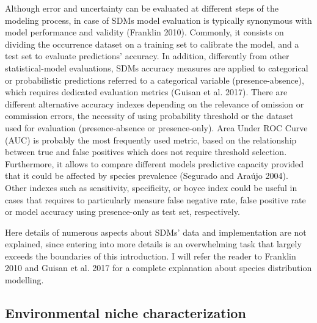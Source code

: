 \documentclass[11pt,twoside]{reedthesis}
\begin{document}
Although error and uncertainty can be evaluated at different steps of
the modeling process, in case of SDMs model evaluation is typically
synonymous with model performance and validity (Franklin 2010).
Commonly, it consists on dividing the occurrence dataset on a training
set to calibrate the model, and a test set to evaluate predictions'
accuracy. In addition, differently from other statistical-model
evaluations, SDMs accuracy measures are applied to categorical or
probabilistic predictions referred to a categorical variable
(presence-absence), which requires dedicated evaluation metrics (Guisan
et al. 2017). There are different alternative accuracy indexes depending
on the relevance of omission or commission errors, the necessity of
using probability threshold or the dataset used for evaluation
(presence-absence or presence-only). Area Under ROC Curve (AUC) is
probably the most frequently used metric, based on the relationship
between true and false positives which does not require threshold
selection. Furthermore, it allows to compare different models predictive
capacity provided that it could be affected by species prevalence
(Segurado and Araújo 2004). Other indexes such as sensitivity,
specificity, or boyce index could be useful in cases that requires to
particularly measure false negative rate, false positive rate or model
accuracy using presence-only as test set, respectively.\par

Here details of numerous aspects about SDMs' data and implementation are
not explained, since entering into more details is an overwhelming task
that largely exceeds the boundaries of this introduction. I will refer
the reader to Franklin 2010 and Guisan et al. 2017 for a complete
explanation about species distribution modelling.\par

\subsection{Environmental niche
characterization}\label{environmental-niche-characterization}

\par
\end{document}
